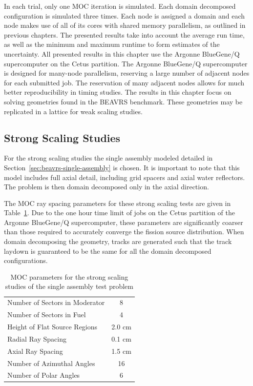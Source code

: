In each trial, only one \ac{MOC} iteration is simulated. Each domain decomposed configuration is simulated three times. Each node is assigned a domain and each node makes use of all of its cores with shared memory parallelism, as outlined in previous chapters. The presented results take into account the average run time, as well as the minimum and maximum runtime to form estimates of the uncertainty. All presented results in this chapter use the Argonne BlueGene/Q supercomputer on the Cetus partition. The Argonne BlueGene/Q supercomputer is designed for many-node parallelism, reserving a large number of adjacent nodes for each submitted job. The reservation of many adjacent nodes allows for much better reproducibility in timing studies. The results in this chapter focus on solving geometries found in the BEAVRS benchmark. These geometries may be replicated in a lattice for weak scaling studies. 

\subsection{Strong Scaling Studies}
\label{sec:dd-strong-scaling}

For the strong scaling studies the single assembly modeled detailed in Section~\ref{sec:beavrs-single-assembly} is chosen. It is important to note that this model includes full axial detail, including grid spacers and axial water reflectors. The problem is then domain decomposed only in the axial direction. 

The \ac{MOC} ray spacing parameters for these strong scaling tests are given in Table~\ref{tab:dd-ss-params}. Due to the one hour time limit of jobs on the Cetus partition of the Argonne BlueGene/Q supercomputer, these parameters are significantly coarser than those required to accurately converge the fission source distribution. When domain decomposing the geometry, tracks are generated such that the track laydown is guaranteed to be the same for all the domain decomposed configurations.

\begin{table}[ht]
	\centering
	\caption{MOC parameters for the strong scaling studies of the single assembly test problem}
	\medskip
	\begin{tabular}{lc}
		\hline
		Number of Sectors in Moderator & 8 \\
		Number of Sectors in Fuel & 4 \\
		Height of Flat Source Regions & 2.0 cm \\
		Radial Ray Spacing & 0.1 cm \\
		Axial Ray Spacing & 1.5 cm \\
		Number of Azimuthal Angles & 16 \\
		Number of Polar Angles & 6 \\
		\hline
	\end{tabular}
	\label{tab:dd-ss-params}
\end{table}

